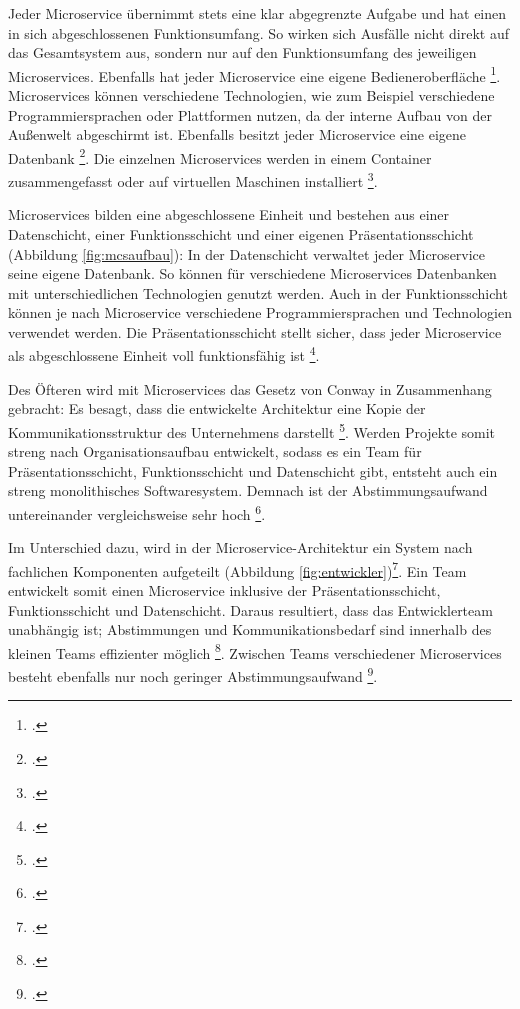 Jeder Microservice übernimmt stets eine klar abgegrenzte Aufgabe und hat einen in sich abgeschlossenen Funktionsumfang. So wirken sich Ausfälle nicht direkt auf das Gesamtsystem aus, sondern nur auf den Funktionsumfang des jeweiligen Microservices. Ebenfalls hat jeder Microservice eine eigene Bedieneroberfläche \footcite[Vgl.][S.79]{albrecht2020}. Microservices können verschiedene Technologien, wie zum Beispiel verschiedene Programmiersprachen oder Plattformen nutzen, da der interne Aufbau von der Außenwelt abgeschirmt ist. Ebenfalls besitzt jeder Microservice eine eigene Datenbank \footcite[Vgl.][S.2]{wolff2018}. Die einzelnen Microservices werden in einem Container zusammengefasst oder auf virtuellen Maschinen installiert \footcite[Vgl.][S.79]{albrecht2020}.

Microservices bilden eine abgeschlossene Einheit und bestehen aus einer Datenschicht, einer Funktionsschicht und einer eigenen Präsentationsschicht (Abbildung \ref{fig:mcsaufbau}): In der Datenschicht verwaltet jeder Microservice seine eigene Datenbank. So können für verschiedene Microservices Datenbanken mit unterschiedlichen Technologien genutzt werden. Auch in der Funktionsschicht können je nach Microservice verschiedene Programmiersprachen und Technologien verwendet werden. Die Präsentationsschicht stellt sicher, dass jeder Microservice als abgeschlossene Einheit voll funktionsfähig ist \footcite[Vgl.][S.81 f.]{albrecht2020}.


Des Öfteren wird mit Microservices das Gesetz von Conway in Zusammenhang gebracht: Es besagt, dass die entwickelte Architektur eine Kopie der Kommunikationsstruktur des Unternehmens darstellt \footcite[Vgl.][S.2]{fowler2015}. Werden Projekte somit streng nach Organisationsaufbau entwickelt, sodass es ein Team für Präsentationsschicht, Funktionsschicht und Datenschicht gibt, entsteht auch ein streng monolithisches Softwaresystem. Demnach ist der Abstimmungsaufwand untereinander vergleichsweise sehr hoch \footcite[Vgl.][S.81]{albrecht2020}. 

Im Unterschied dazu, wird in der Microservice-Architektur ein System nach fachlichen Komponenten aufgeteilt (Abbildung \ref{fig:entwickler})\footcite[Vgl.][S.81 f.]{albrecht2020}. Ein Team entwickelt somit einen Microservice inklusive der Präsentationsschicht, Funktionsschicht und Datenschicht. Daraus resultiert, dass das Entwicklerteam unabhängig ist; Abstimmungen und Kommunikationsbedarf sind innerhalb des kleinen Teams effizienter möglich \footcite[Vgl.][S.41]{wolff2018}. Zwischen Teams verschiedener Microservices besteht ebenfalls nur noch geringer Abstimmungsaufwand \footcite[Vgl.][S.81]{albrecht2020}.

